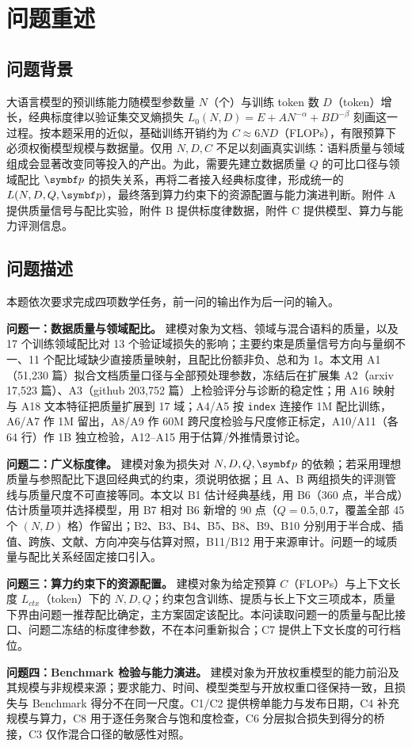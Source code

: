 \section{问题重述}
\label{sec:1}

\subsection{问题背景}
\label{sec:1.1}

大语言模型的预训练能力随模型参数量 $N$（个）与训练 token 数 $D$（token）增长，经典标度律以验证集交叉熵损失 $L_0(N,D)=E+AN^{-\alpha}+BD^{-\beta}$ 刻画这一过程\cite{hoffmann,bahri}。按本题采用的近似，基础训练开销约为 $C\approx 6ND$（FLOPs），有限预算下必须权衡模型规模与数据量。仅用 $N,D,C$ 不足以刻画真实训练：语料质量与领域组成会显著改变同等投入的产出。为此，需要先建立数据质量 $Q$ 的可比口径与领域配比 $\bp$ 的损失关系，再将二者接入经典标度律，形成统一的 $L(N,D,Q,\bp)$，最终落到算力约束下的资源配置与能力演进判断。附件 A 提供质量信号与配比实验，附件 B 提供标度律数据，附件 C 提供模型、算力与能力评测信息。

\subsection{问题描述}
\label{sec:1.2}

本题依次要求完成四项数学任务，前一问的输出作为后一问的输入。

\textbf{问题一：数据质量与领域配比。} 建模对象为文档、领域与混合语料的质量，以及 17 个训练领域配比对 13 个验证域损失的影响；主要约束是质量信号方向与量纲不一、11 个配比域缺少直接质量映射，且配比份额非负、总和为 1。本文用 A1（51,230 篇）拟合文档质量口径与全部预处理参数，冻结后在扩展集 A2（arxiv 17,523 篇）、A3（github 203,752 篇）上检验评分与诊断的稳定性；用 A16 映射与 A18 文本特征把质量扩展到 17 域；A4/A5 按 \texttt{index} 连接作 1M 配比训练，A6/A7 作 1M 留出，A8/A9 作 60M 跨尺度检验与尺度修正标定，A10/A11（各 64 行）作 1B 独立检验，A12–A15 用于估算/外推情景讨论。

\textbf{问题二：广义标度律。} 建模对象为损失对 $N,D,Q,\bp$ 的依赖；若采用理想质量与参照配比下退回经典式的约束，须说明依据；且 A、B 两组损失的评测管线与质量尺度不可直接等同。本文以 B1 估计经典基线，用 B6（360 点，半合成）估计质量项并选择模型，用 B7 相对 B6 新增的 90 点（$Q=0.5,0.7$，覆盖全部 45 个 $(N,D)$ 格）作留出；B2、B3、B4、B5、B8、B9、B10 分别用于半合成、插值、跨族、文献、方向冲突与估算对照，B11/B12 用于来源审计。问题一的域质量与配比关系经固定接口引入。

\textbf{问题三：算力约束下的资源配置。} 建模对象为给定预算 $C$（FLOPs）与上下文长度 $L_{ctx}$（token）下的 $N,D,Q$；约束包含训练、提质与长上下文三项成本，质量下界由问题一推荐配比确定，主方案固定该配比。本问读取问题一的质量与配比接口、问题二冻结的标度律参数，不在本问重新拟合；C7 提供上下文长度的可行档位。

\textbf{问题四：Benchmark 检验与能力演进。} 建模对象为开放权重模型的能力前沿及其规模与非规模来源；要求能力、时间、模型类型与开放权重口径保持一致，且损失与 Benchmark 得分不在同一尺度。C1/C2 提供榜单能力与发布日期，C4 补充规模与算力，C8 用于逐任务聚合与饱和度检查，C6 分层拟合损失到得分的桥接，C3 仅作混合口径的敏感性对照。
